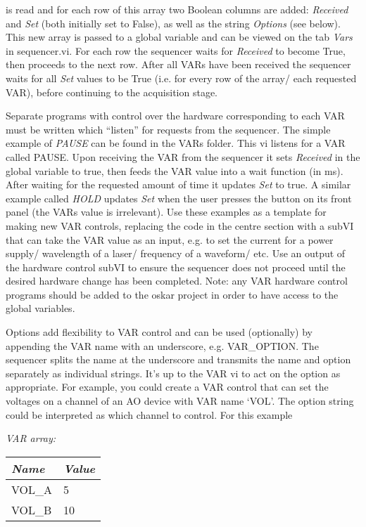 \documentclass[10pt,a4paper]{article}
\begin{document}
\noindent is read and for each row of this array two Boolean columns are added: \emph{Received} and \emph{Set} (both initially set to False), as well as the string \emph{Options} (see below).  This new array is passed to a global variable and can be viewed on the tab \emph{Vars} in sequencer.vi.  For each row the sequencer waits for \emph{Received} to become True, then proceeds to the next row. After all VARs have been received the sequencer waits for all \emph{Set} values to be True (i.e. for every row of the array/ each requested VAR), before continuing to the acquisition stage.

Separate programs with control over the hardware corresponding to each VAR must be written which ``listen'' for requests from the sequencer.  The simple example of \emph{PAUSE} can be found in the VARs folder.  This vi listens for a VAR called PAUSE. Upon receiving the VAR from the sequencer it sets \emph{Received} in the global variable to true, then feeds the VAR value into a wait function (in ms). After waiting for the requested amount of time it updates \emph{Set} to true.  A similar example called \emph{HOLD} updates \emph{Set} when the user presses the button on its front panel (the VARs value is irrelevant). Use these examples as a template for making new VAR controls, replacing the code in the centre section with a subVI that can take the VAR value as an input, e.g. to set the current for a power supply/ wavelength of a  laser/ frequency of a waveform/ etc.  Use an output of the hardware control subVI to ensure the sequencer does not proceed until the desired hardware change has been completed. Note: any VAR hardware control programs should be added to the oskar project in order to have access to the global variables.

Options add flexibility to VAR control and can be used (optionally) by appending the VAR name with an underscore, e.g. VAR\_OPTION.  The sequencer splits the name at the underscore and transmits the name and option separately as individual strings.  It's up to the VAR vi to act on the option as appropriate.  For example, you could create a VAR control that can set the voltages on a channel of an AO device with VAR name `VOL'.  The option string could be interpreted as which channel to control. For this example

\hangindent=0.7cm
\emph{VAR array:} \\
\begin{tabularx}{0.3\textwidth}{X|X}
	\emph{Name} & \emph{Value} \\
	\hline
	VOL\_A & 5 \\
	VOL\_B & 10 \\
\end{tabularx}
\vspace{2mm}
\end{document}
